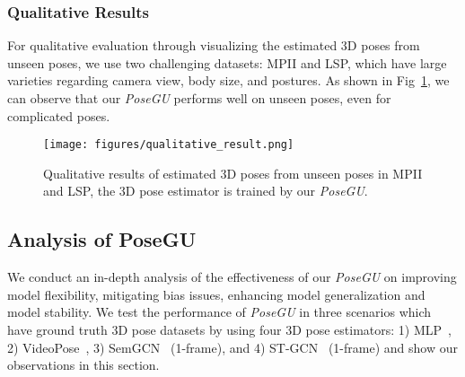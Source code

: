 \documentclass[runningheads]{llncs}
\begin{document}
\subsubsection{Qualitative Results} 
For qualitative evaluation through visualizing the estimated 3D poses from unseen poses, we use two challenging datasets: MPII and LSP, which have large varieties regarding camera view, body size, and postures. 
As shown in Fig~\ref{fig:quantitiveresult}, we can observe that our \textit{PoseGU} performs well on unseen poses, even for complicated poses. 

\begin{figure}[h]
    \centering
    \texttt{[image: figures/qualitative\_result.png]}
    \caption{Qualitative results of estimated 3D poses from unseen poses in MPII and LSP, the 3D pose estimator is trained by our \textit{PoseGU}.}
    \label{fig:quantitiveresult}
\end{figure}

\subsection{Analysis of PoseGU}
We conduct an in-depth analysis of the effectiveness of our \textit{PoseGU} on improving model flexibility, mitigating bias issues, enhancing model generalization and model stability. 
We test the performance of \textit{PoseGU} in three scenarios which have ground truth 3D pose datasets by using four 3D pose estimators: 1) MLP~\cite{mlp}, 2) VideoPose~\cite{videopose}, 3) SemGCN~\cite{semigcn} (1-frame), and 4) ST-GCN~\cite{stgcn} (1-frame) and show our observations in this section. 
\end{document}
